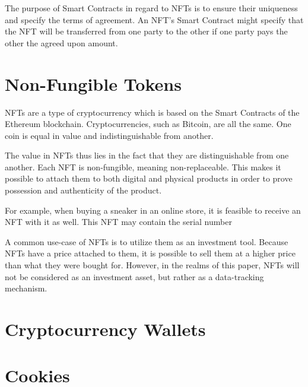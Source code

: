 The purpose of Smart Contracts in regard to NFTs is to ensure their uniqueness and specify the terms of agreement. An NFT's Smart Contract might specify that the NFT will be transferred from one party to the other if one party pays the other the agreed upon amount.


%
%
\section{Non-Fungible Tokens}
\label{sec:background:nfts}
NFTs are a type of cryptocurrency which is based on the Smart Contracts of the Ethereum blockchain. Cryptocurrencies, such as Bitcoin, are all the same. One coin is equal in value and indistinguishable from another. \cite{nftOverview}

The value in NFTs thus lies in the fact that they are distinguishable from one another. Each NFT is non-fungible, meaning non-replaceable. This makes it possible to attach them to both digital and physical products in order to prove possession and authenticity of the product. \cite{nftOverview}


For example, when buying a sneaker in an online store, it is feasible to receive an NFT with it as well. This NFT may contain the serial number %

A common use-case of NFTs is to utilize them as an investment tool. Because NFTs have a price attached to them, it is possible to sell them at a higher price than what they were bought for. However, in the realms of this paper, NFTs will not be considered as an investment asset, but rather as a data-tracking mechanism. %


%
%
\section{Cryptocurrency Wallets}
\label{sec:background:wallets}


%
%
\section{Cookies}
\label{sec:background:cookies}



